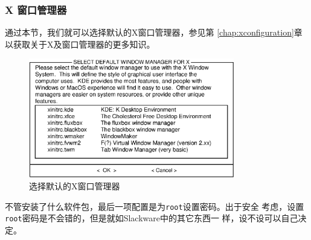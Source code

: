 \subsubsection{X 窗口管理器}
\label{sec:installation:setup:configure:xWindowManager}

通过本节，我们就可以选择默认的X窗口管理器，参见第
\ref{chap:xconfiguration}章以获取关于X及窗口管理器的更多知识。
\begin{figure}[htpb]
  \centering
  \includegraphics[width=0.8\textwidth]{images/installation/setup-xwmconfig.eps}
  \caption{选择默认的X窗口管理器}
  \label{fig:setup-xwmconfig}
\end{figure}

不管安装了什么软件包，最后一项配置是为\texttt{root}设置密码。出于安全
考虑，设置\texttt{root}密码是不会错的，但是就如Slackware中的其它东西一
样，设不设可以自己决定。





